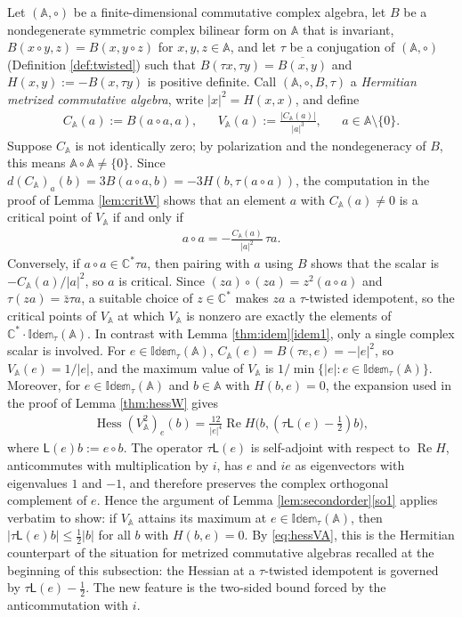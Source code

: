 \documentclass [leqno, 10pt]{amsart}
\theoremstyle{definition}
\numberwithin{equation}{section}
\newcommand{\idem}{\mathbb{Idem}}
\newcommand{\alg}{\mathbb{A}}
\newcommand{\mlt}{\circ}
\newcommand{\hess}{\operatorname{Hess}}
\newcommand{\lin}{\mathsf{L}}
\newcommand{\re}{\operatorname{Re}}
\newcommand{\com}{\mathbb C}
\newcommand{\nnorm}[1]{\lvert #1\rvert}%
\begin{document}
Let $(\alg, \mlt)$ be a finite-dimensional commutative complex algebra, let $B$ be a nondegenerate symmetric complex bilinear form on $\alg$ that is invariant, $B(x \mlt y, z) = B(x, y \mlt z)$ for $x, y, z \in \alg$, and let $\tau$ be a conjugation of $(\alg, \mlt)$ (Definition \ref{def:twisted}) such that $B(\tau x, \tau y) = \overline{B(x, y)}$ and $H(x, y) := -B(x, \tau y)$ is positive definite. Call $(\alg, \mlt, B, \tau)$ a \emph{Hermitian metrized commutative algebra}, write $\nnorm{x}^{2} = H(x, x)$, and define
\begin{align}\label{eq:VA}
&C_{\alg}(a) := B(a \mlt a, a),& &V_{\alg}(a) := \frac{|C_{\alg}(a)|}{\nnorm{a}^{3}},& &a \in \alg \setminus \{0\}.&
\end{align}
Suppose $C_{\alg}$ is not identically zero; by polarization and the nondegeneracy of $B$, this means $\alg \mlt \alg \neq \{0\}$. Since $d(C_{\alg})_{a}(b) = 3B(a \mlt a, b) = -3H(b, \tau(a \mlt a))$, the computation in the proof of Lemma \ref{lem:critW} shows that an element $a$ with $C_{\alg}(a) \neq 0$ is a critical point of $V_{\alg}$ if and only if
\begin{align}\label{eq:VAcrit}
a \mlt a = -\frac{C_{\alg}(a)}{\nnorm{a}^{2}}\,\tau a.
\end{align}
Conversely, if $a \mlt a \in \com^{\ast}\tau a$, then pairing with $a$ using $B$ shows that the scalar is $-C_{\alg}(a)/\nnorm{a}^{2}$, so $a$ is critical. Since $(za) \mlt (za) = z^{2}(a \mlt a)$ and $\tau(za) = \bar{z}\tau a$, a suitable choice of $z \in \com^{\ast}$ makes $za$ a $\tau$-twisted idempotent, so the critical points of $V_{\alg}$ at which $V_{\alg}$ is nonzero are exactly the elements of $\com^{\ast}\cdot\idem_{\tau}(\alg)$. In contrast with Lemma \ref{thm:idem}\ref{idem1}, only a single complex scalar is involved. For $e \in \idem_{\tau}(\alg)$, $C_{\alg}(e) = B(\tau e, e) = -\nnorm{e}^{2}$, so $V_{\alg}(e) = 1/\nnorm{e}$, and the maximum value of $V_{\alg}$ is $1/\min\{\nnorm{e}: e \in \idem_{\tau}(\alg)\}$. Moreover, for $e \in \idem_{\tau}(\alg)$ and $b \in \alg$ with $H(b, e) = 0$, the expansion used in the proof of Lemma \ref{thm:hessW} gives
\begin{align}\label{eq:hessVA}
\hess(V_{\alg}^{2})_{e}(b) = \frac{12}{\nnorm{e}^{4}}\re H\big(b, (\tau\lin(e) - \tfrac{1}{2})b\big),
\end{align}
where $\lin(e)b := e \mlt b$. The operator $\tau\lin(e)$ is self-adjoint with respect to $\re H$, anticommutes with multiplication by $i$, has $e$ and $ie$ as eigenvectors with eigenvalues $1$ and $-1$, and therefore preserves the complex orthogonal complement of $e$. Hence the argument of Lemma \ref{lem:secondorder}\ref{so1} applies verbatim to show: if $V_{\alg}$ attains its maximum at $e \in \idem_{\tau}(\alg)$, then $\nnorm{\tau\lin(e)b} \leq \tfrac{1}{2}\nnorm{b}$ for all $b$ with $H(b, e) = 0$. By \eqref{eq:hessVA}, this is the Hermitian counterpart of the situation for metrized commutative algebras recalled at the beginning of this subsection: the Hessian at a $\tau$-twisted idempotent is governed by $\tau\lin(e) - \tfrac{1}{2}$. The new feature is the two-sided bound forced by the anticommutation with $i$.
\end{document}
